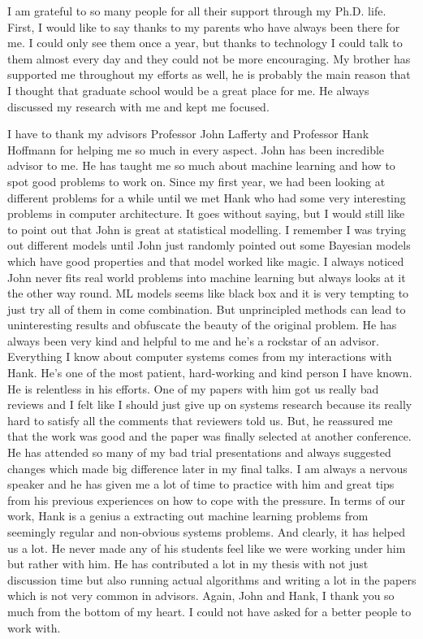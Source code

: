 I am grateful to so many people for all their support through my Ph.D. life. First,
I would like to say thanks to my parents who have always been there for me. I could
only see them once a year, but thanks to technology I could talk to them almost every day
and they could not be more encouraging. My brother has supported me throughout
my efforts as well, he is probably the main reason that I thought that graduate
school would be a great place for me. He always discussed my research with me and
kept me focused.

I have to thank my advisors Professor John Lafferty and Professor Hank Hoffmann for helping me so much in every aspect. 
John has been incredible advisor to me. He has taught me so much about machine 
learning and how to spot good problems to work on. Since my first year, we had been looking at different 
problems for a while until we met Hank who had some very interesting problems in 
computer architecture. It goes without saying, but I would still like to point out that John is great at statistical modelling. 
I remember I was trying out different models until John just randomly 
pointed out some Bayesian models which have good properties and that model worked like magic.
I always noticed John never fits real world problems into machine learning 
but always looks at it the other way round. ML models seems like black box and it is very tempting to just try all of them in come combination. 
But unprincipled methods can lead to uninteresting results and obfuscate the beauty of the original problem.
He has always been very kind and helpful to 
me and he's a rockstar of an advisor. Everything I know about computer systems comes from 
my interactions with Hank.
He's one of the most patient, hard-working and kind person I have known. He is
relentless in his efforts. One of my papers with him got us really bad reviews and 
I felt like I should just give up on systems research because its really hard to 
satisfy all the comments that reviewers told us. But, he reassured me that the work was good and 
the paper was finally selected at another conference. He has attended so many of my bad trial presentations
and always suggested changes which made big difference later in my final talks.
I am always a nervous speaker and he has given me a lot of time to practice with him 
and great tips from his previous experiences on how to cope with the pressure.
In terms of our work, Hank is a genius a extracting out machine learning problems
from seemingly regular and non-obvious systems problems. And clearly, it has helped us a lot.
He never made any of his students feel like we were working under him but rather with him.
He has contributed a lot in my thesis with not just discussion time but also running actual 
algorithms and writing a lot in the papers which is not very common in advisors. Again, John and Hank,
I thank you so much from the bottom of my heart. I could not have asked for a better people 
to work with. 

